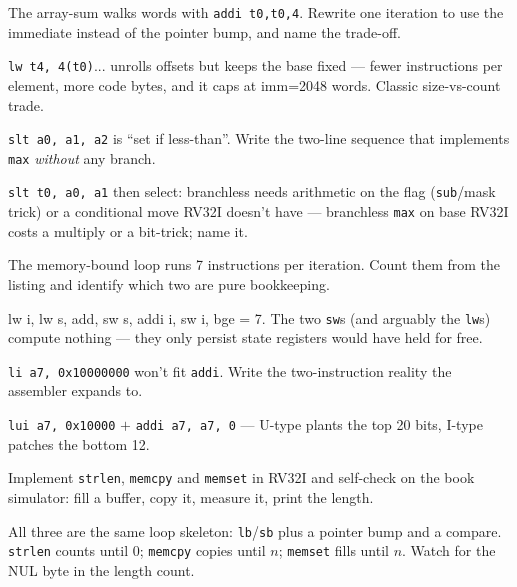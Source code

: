 \begin{exercise}\label{ex:m03b}
The array-sum walks words with \texttt{addi t0,t0,4}. Rewrite one
iteration to use the immediate instead of the pointer bump, and name
the trade-off.
\end{exercise}
\begin{solution}[hint]
\texttt{lw t4, 4(t0)}... unrolls offsets but keeps the base fixed ---
fewer instructions per element, more code bytes, and it caps at
imm=2048 words. Classic size-vs-count trade.
\end{solution}

\begin{exercise}\label{ex:m03c}
\texttt{slt a0, a1, a2} is ``set if less-than''. Write the two-line
sequence that implements \texttt{max} \emph{without} any branch.
\end{exercise}
\begin{solution}[hint]
\texttt{slt t0, a0, a1} then select: branchless needs arithmetic on
the flag (\texttt{sub}/mask trick) or a conditional move RV32I
doesn't have --- branchless \texttt{max} on base RV32I costs a
multiply or a bit-trick; name it.
\end{solution}

\begin{exercise}\label{ex:m03d}
The memory-bound loop runs 7 instructions per iteration. Count them
from the listing and identify which two are pure bookkeeping.
\end{exercise}
\begin{solution}[hint]
lw i, lw s, add, sw s, addi i, sw i, bge = 7. The two
\texttt{sw}s (and arguably the \texttt{lw}s) compute nothing ---
they only persist state registers would have held for free.
\end{solution}

\begin{exercise}\label{ex:m03e}
\texttt{li a7, 0x10000000} won't fit \texttt{addi}. Write the
two-instruction reality the assembler expands to.
\end{exercise}
\begin{solution}[hint]
\texttt{lui a7, 0x10000} $+$ \texttt{addi a7, a7, 0} --- U-type
plants the top 20 bits, I-type patches the bottom 12.
\end{solution}

\begin{exercise}[hard]\label{ex:h03a}
Implement \texttt{strlen}, \texttt{memcpy} and \texttt{memset} in
RV32I and self-check on the book simulator: fill a buffer, copy it,
measure it, print the length.
\end{exercise}
\begin{solution}[hint]
All three are the same loop skeleton: \texttt{lb}/\texttt{sb} plus a
pointer bump and a compare. \texttt{strlen} counts until 0;
\texttt{memcpy} copies until $n$; \texttt{memset} fills until $n$.
Watch for the NUL byte in the length count.
\end{solution}


